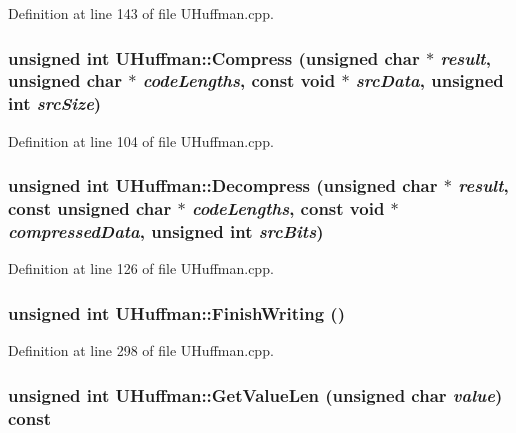 Definition at line 143 of file UHuffman.cpp.\hypertarget{class_u_huffman_b67d54176bba1e872cbd7f5cf1f7da97}{
\subsubsection[{Compress}]{\setlength{\rightskip}{0pt plus 5cm}unsigned int UHuffman::Compress (unsigned char $\ast$ {\em result}, \/  unsigned char $\ast$ {\em codeLengths}, \/  const void $\ast$ {\em srcData}, \/  unsigned int {\em srcSize})}}
\label{class_u_huffman_b67d54176bba1e872cbd7f5cf1f7da97}




Definition at line 104 of file UHuffman.cpp.\hypertarget{class_u_huffman_346391382b61c9da44b8895bcd2ccf6b}{
\subsubsection[{Decompress}]{\setlength{\rightskip}{0pt plus 5cm}unsigned int UHuffman::Decompress (unsigned char $\ast$ {\em result}, \/  const unsigned char $\ast$ {\em codeLengths}, \/  const void $\ast$ {\em compressedData}, \/  unsigned int {\em srcBits})}}
\label{class_u_huffman_346391382b61c9da44b8895bcd2ccf6b}




Definition at line 126 of file UHuffman.cpp.\hypertarget{class_u_huffman_516c71caadbb3ae69cff3d66453c140f}{
\subsubsection[{FinishWriting}]{\setlength{\rightskip}{0pt plus 5cm}unsigned int UHuffman::FinishWriting ()}}
\label{class_u_huffman_516c71caadbb3ae69cff3d66453c140f}




Definition at line 298 of file UHuffman.cpp.\hypertarget{class_u_huffman_6983a5b88a551be8221fcd69b1dfa6b7}{
\subsubsection[{GetValueLen}]{\setlength{\rightskip}{0pt plus 5cm}unsigned int UHuffman::GetValueLen (unsigned char {\em value}) const}}
\label{class_u_huffman_6983a5b88a551be8221fcd69b1dfa6b7}




